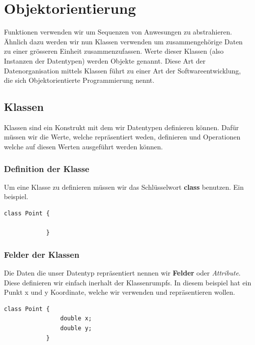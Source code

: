\documentclass[12pt]{article}
\begin{document}
\section*{Objektorientierung}
    Funktionen verwenden wir um Sequenzen von Anwesungen zu abstrahieren.
    Ähnlich dazu werden wir nun Klassen verwenden um zusammengehörige Daten zu einer grösseren Einheit zusammenzufassen. 
    Werte dieser Klassen (also Instanzen der Datentypen) werden Objekte genannt. 
    Diese Art der Datenorganisation mittels Klassen führt zu einer Art der Softwareentwicklung, die sich Objektorientierte Programmierung nennt.

    \subsection*{Klassen}
    Klassen sind ein Konstrukt mit dem wir Datentypen definieren können. Dafür müssen wir die Werte, welche repräsentiert weden, definieren und 
    Operationen welche auf diesen Werten ausgeführt werden können. 

        \subsubsection*{Definition der Klasse}
        Um eine Klasse zu definieren müssen wir das Schlüsselwort \textbf{class} benutzen. Ein beispiel. 

        \begin{lstlisting}[label=Klassen definieren,caption=Klasse definieren]
            class Point {

            }
        \end{lstlisting}

        \subsubsection*{Felder der Klassen}

        Die Daten die unser Datentyp repräsentiert nennen wir \textbf{Felder} oder \textit{Attribute}. Diese definieren wir einfach 
        inerhalt der Klassenrumpfs. In diesem beispiel hat ein Punkt x und y Koordinate, welche wir verwenden und repräsentieren wollen. 

        \begin{lstlisting}[label="", caption=Felder]
            class Point {
                double x;
                double y;
            }
        \end{lstlisting}
\end{document}
